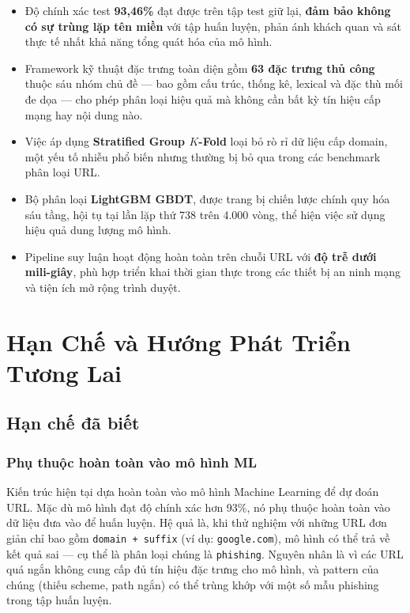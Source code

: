 \documentclass[a4paper,12pt]{article}
\begin{document}
\begin{itemize}
    \item Độ chính xác test \textbf{93,46\%} đạt được trên tập test giữ lại, \textbf{đảm bảo không có sự trùng lặp tên miền} với tập huấn luyện, phản ánh khách quan và sát thực tế nhất khả năng tổng quát hóa của mô hình.
    \item Framework kỹ thuật đặc trưng toàn diện gồm \textbf{63 đặc trưng thủ công} thuộc sáu nhóm chủ đề --- bao gồm cấu trúc, thống kê, lexical và đặc thù mối đe dọa --- cho phép phân loại hiệu quả mà không cần bất kỳ tín hiệu cấp mạng hay nội dung nào.
    \item Việc áp dụng \textbf{Stratified Group $K$-Fold} loại bỏ rò rỉ dữ liệu cấp domain, một yếu tố nhiễu phổ biến nhưng thường bị bỏ qua trong các benchmark phân loại URL.
    \item Bộ phân loại \textbf{LightGBM GBDT}, được trang bị chiến lược chính quy hóa sáu tầng, hội tụ tại lần lặp thứ 738 trên 4.000 vòng, thể hiện việc sử dụng hiệu quả dung lượng mô hình.
    \item Pipeline suy luận hoạt động hoàn toàn trên chuỗi URL với \textbf{độ trễ dưới mili-giây}, phù hợp triển khai thời gian thực trong các thiết bị an ninh mạng và tiện ích mở rộng trình duyệt.
\end{itemize}

\section{Hạn Chế và Hướng Phát Triển Tương Lai}
\label{sec:limitations}

\subsection{Hạn chế đã biết}

\subsubsection{Phụ thuộc hoàn toàn vào mô hình ML}

Kiến trúc hiện tại dựa hoàn toàn vào mô hình Machine Learning để dự đoán URL. Mặc dù mô hình đạt độ chính xác hơn 93\%, nó phụ thuộc hoàn toàn vào dữ liệu đưa vào để huấn luyện. Hệ quả là, khi thử nghiệm với những URL đơn giản chỉ bao gồm \texttt{domain + suffix} (ví dụ: \texttt{google.com}), mô hình có thể trả về kết quả sai --- cụ thể là phân loại chúng là \texttt{phishing}. Nguyên nhân là vì các URL quá ngắn không cung cấp đủ tín hiệu đặc trưng cho mô hình, và pattern của chúng (thiếu scheme, path ngắn) có thể trùng khớp với một số mẫu phishing trong tập huấn luyện.
\end{document}
